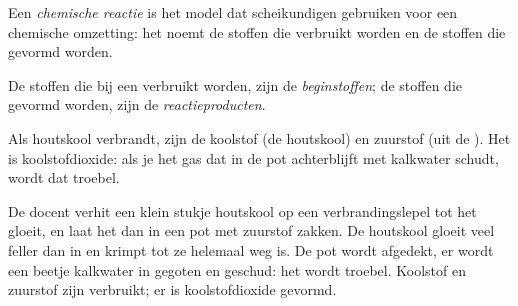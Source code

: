 \begin{definition}\label{def:g7:chemical-reactions:reaction}
Een \emph{chemische reactie} is het model dat
scheikundigen gebruiken voor een chemische omzetting: het noemt de
stoffen die verbruikt worden en de stoffen die gevormd worden.
\end{definition}

\begin{definition}\label{def:g7:chemical-reactions:reactant}
De stoffen die bij een  verbruikt worden, zijn de
\emph{beginstoffen}; de stoffen die gevormd worden, zijn
de \emph{reactieproducten}.
\end{definition}

\begin{example}\label{ex:g7:chemical-reactions:carbon}
Als houtskool verbrandt, zijn de  koolstof (de houtskool) en
zuurstof (uit de ). Het  is koolstofdioxide: als je
het gas dat in de pot achterblijft met kalkwater schudt, wordt dat
troebel.
\end{example}

\begin{inthelab}
De docent verhit een klein stukje houtskool op een verbrandingslepel tot
het gloeit, en laat het dan in een pot met zuurstof zakken. De houtskool
gloeit veel feller dan in  en krimpt tot ze helemaal weg is. De pot
wordt afgedekt, er wordt een beetje kalkwater in gegoten en geschud: het
wordt troebel. Koolstof en zuurstof zijn verbruikt; er is koolstofdioxide
gevormd.
\end{inthelab}

